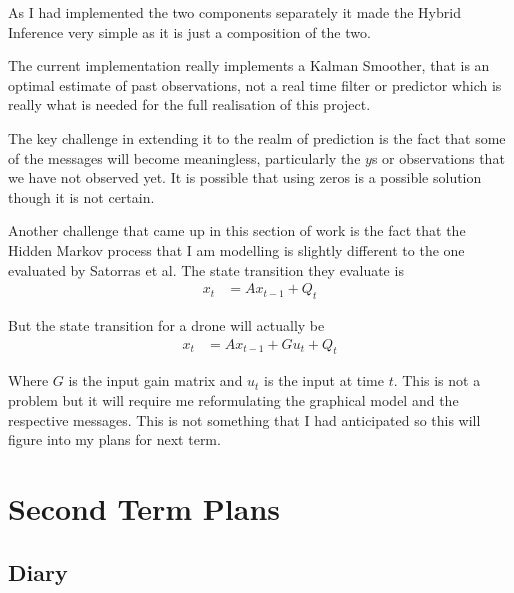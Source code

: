 \documentclass[]{../resources/final_report}
\begin{document}
As I had implemented the two components separately it made the Hybrid Inference very simple as it is just a composition of the two.

The current implementation really implements a Kalman Smoother, that is an optimal estimate of past observations, not a real time filter or predictor which is really what is needed for the full realisation of this project.

The key challenge in extending it to the realm of prediction is the fact that some of the messages will become meaningless, particularly the $y$s or observations that we have not observed yet. It is possible that using zeros is a possible solution though it is not certain.

Another challenge that came up in this section of work is the fact that the Hidden Markov process that I am modelling is slightly different to the one evaluated by Satorras et al.
The state transition they evaluate is 
\begin{align}
  x_t &= Ax_{t-1} + Q_t
\end{align}

But the state transition for a drone will actually be
\begin{align}
  x_t &= Ax_{t-1} + Gu_t + Q_t
\end{align} 

Where $G$ is the input gain matrix and $u_t$ is the input at time $t$.
This is not a problem but it will require me reformulating the graphical model and the respective messages. This is not something that I had anticipated so this will figure into my plans for next term.

\chapter{Second Term Plans}






\section{Diary}




\newpage


\nocite{*}

\label{endpage}
\end{document}
